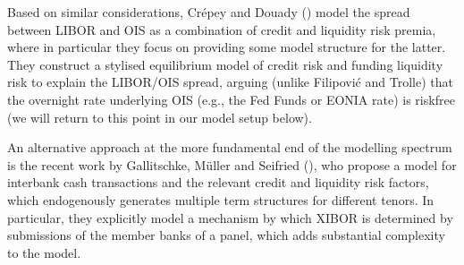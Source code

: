\documentclass[12pt,a4paper]{article}
\theoremstyle{plain}
\numberwithin{equation}{section}
\begin{document}
Based on similar considerations, Cr\'epey and Douady  (\citeyear*{CreDou:2013}) model the spread between LIBOR and OIS as a combination of credit and liquidity risk premia, where in particular they focus on providing some model structure for the latter. They construct a stylised equilibrium model of credit risk and funding liquidity risk to explain the LIBOR/OIS spread, arguing (unlike Filipovi\'c and Trolle) that the overnight rate underlying OIS (e.g., the Fed Funds or EONIA rate) is riskfree (we will return to this point in our model setup below).

An alternative approach at the more fundamental end of the modelling spectrum is the recent work by Gallitschke, M\"uller and Seifried (\citeyear*{GalMulSei:2014}), who propose a model for interbank cash transactions and the relevant credit and liquidity risk factors, which endogenously generates multiple term structures for different tenors. In particular, they explicitly model a mechanism by which XIBOR is determined by submissions of the member banks of a panel, which adds substantial complexity to the model.
\end{document}

